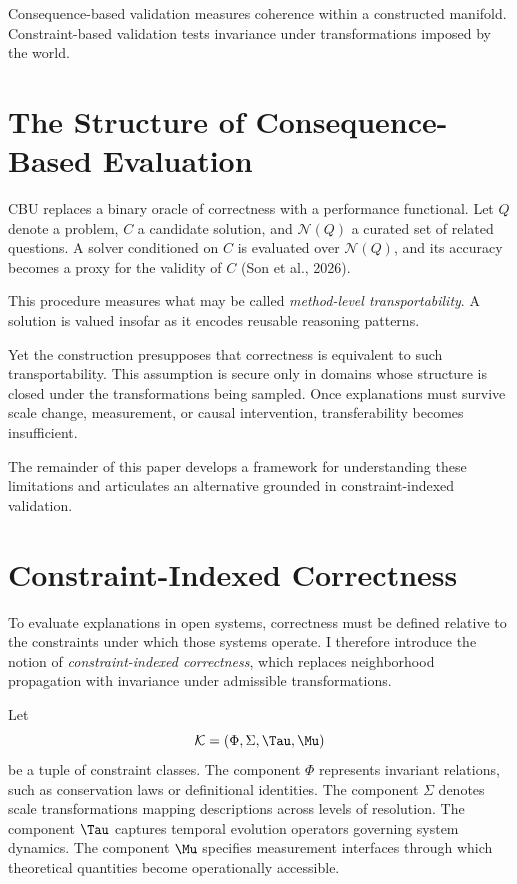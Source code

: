 \documentclass[12pt]{article}
\begin{document}
Consequence-based validation measures coherence within a constructed manifold. Constraint-based validation tests invariance under transformations imposed by the world.

\section{The Structure of Consequence-Based Evaluation}

CBU replaces a binary oracle of correctness with a performance functional. Let \(Q\) denote a problem, \(C\) a candidate solution, and \(\mathcal{N}(Q)\) a curated set of related questions. A solver conditioned on \(C\) is evaluated over \(\mathcal{N}(Q)\), and its accuracy becomes a proxy for the validity of \(C\) (Son et al., 2026).

This procedure measures what may be called \emph{method-level transportability}. A solution is valued insofar as it encodes reusable reasoning patterns.

Yet the construction presupposes that correctness is equivalent to such transportability. This assumption is secure only in domains whose structure is closed under the transformations being sampled. Once explanations must survive scale change, measurement, or causal intervention, transferability becomes insufficient.

The remainder of this paper develops a framework for understanding these limitations and articulates an alternative grounded in constraint-indexed validation.

\section{Constraint-Indexed Correctness}

To evaluate explanations in open systems, correctness must be defined relative to the constraints under which those systems operate. I therefore introduce the notion of \emph{constraint-indexed correctness}, which replaces neighborhood propagation with invariance under admissible transformations.

Let
\[
\mathcal{K} = (\Phi, \Sigma, \Tau, \Mu)
\]
be a tuple of constraint classes. The component \(\Phi\) represents invariant relations, such as conservation laws or definitional identities. The component \(\Sigma\) denotes scale transformations mapping descriptions across levels of resolution. The component \(\Tau\) captures temporal evolution operators governing system dynamics. The component \(\Mu\) specifies measurement interfaces through which theoretical quantities become operationally accessible.
\end{document}
